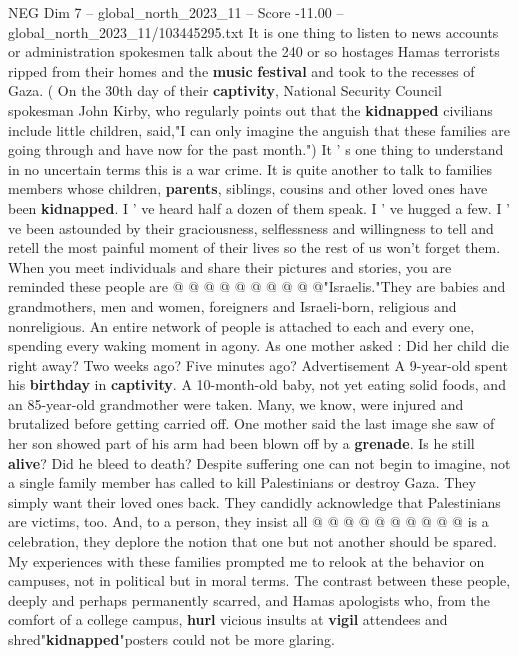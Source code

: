 \begin{textsample}{NEG Dim 7 – global\_north\_2023\_11 – Score -11.00 – global\_north\_2023\_11/103445295.txt}  \label{ex:f7_neg_043}
It is one thing to listen to news accounts or administration spokesmen talk about the 240 or so hostages Hamas terrorists ripped from their homes and the \textbf{music} \textbf{festival} and took to the recesses of Gaza. ( On the 30th day of their \textbf{captivity}, National Security Council spokesman John Kirby, who regularly points out that the \textbf{kidnapped} civilians include little children, said,"I can only imagine the anguish that these families are going through and have now for the past month.") It ' s one thing to understand in no uncertain terms this is a war crime.
It is quite another to talk to families members whose children, \textbf{parents}, siblings, cousins and other loved ones have been \textbf{kidnapped}.
I ' ve heard half a dozen of them speak.
I ' ve hugged a few.
I ' ve been astounded by their graciousness, selflessness and willingness to tell and retell the most painful moment of their lives so the rest of us won't forget them.
When you meet individuals and share their pictures and stories, you are reminded these people are @ @ @ @ @ @ @ @ @ @"Israelis."They are babies and grandmothers, men and women, foreigners and Israeli-born, religious and nonreligious.
An entire network of people is attached to each and every one, spending every waking moment in agony.
As one mother asked : Did her child die right away?
Two weeks ago?
Five minutes ago?
Advertisement A 9-year-old spent his \textbf{birthday} in \textbf{captivity}.
A 10-month-old baby, not yet eating solid foods, and an 85-year-old grandmother were taken.
Many, we know, were injured and brutalized before getting carried off.
One mother said the last image she saw of her son showed part of his arm had been blown off by a \textbf{grenade}.
Is he still \textbf{alive}?
Did he bleed to death?
Despite suffering one can not begin to imagine, not a single family member has called to kill Palestinians or destroy Gaza.
They simply want their loved ones back.
They candidly acknowledge that Palestinians are victims, too.
And, to a person, they insist all @ @ @ @ @ @ @ @ @ @ is a celebration, they deplore the notion that one but not another should be spared.
My experiences with these families prompted me to relook at the behavior on campuses, not in political but in moral terms.
The contrast between these people, deeply and perhaps permanently scarred, and Hamas apologists who, from the comfort of a college campus, \textbf{hurl} vicious insults at \textbf{vigil} attendees and shred"\textbf{kidnapped}"posters could not be more glaring.

\end{textsample}
